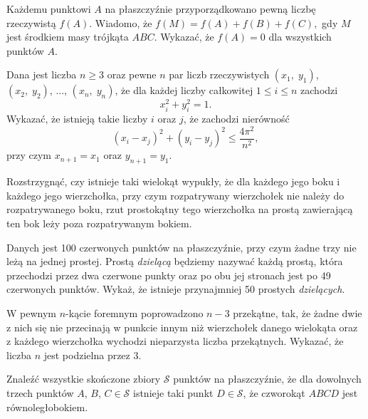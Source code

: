 \begin{problem}{1}
	Każdemu punktowi $A$ na płaszczyźnie przyporządkowano pewną liczbę rzeczywistą $f(A).$ Wiadomo, że $f(M)=f(A)+f(B)+f(C),$ gdy $M$ jest środkiem masy trójkąta $ABC.$ Wykazać, że $f(A)=0$ dla wszystkich punktów $A.$
\end{problem}

\begin{problem}{2}
	Dana jest liczba $n \geqslant 3$ oraz pewne $n$ par liczb rzeczywistych  $(x_1,\; y_1)$, $(x_2,\; y_2)$, ..., $(x_n, \; y_n)$, że dla każdej liczby całkowitej $1 \leqslant i \leqslant n$ zachodzi
	\[
		x_i^2 + y_i^2 = 1.
	\]
	Wykazać, że istnieją takie liczby $i$ oraz $j$, że zachodzi nierówność
	\[
		(x_i - x_{j})^2 + (y_i - y_{j})^2 \leqslant \frac{4\pi^2}{n^2},
	\]
	przy czym $x_{n + 1} = x_1$ oraz $y_{n + 1} = y_1$.
\end{problem}


\begin{problem}{3}
	Rozstrzygnąć, czy istnieje taki wielokąt wypukły, że dla każdego jego boku i każdego jego wierzchołka, przy czym rozpatrywany wierzchołek nie należy do rozpatrywanego boku, rzut prostokątny tego wierzchołka na prostą zawierającą ten bok leży poza rozpatrywanym bokiem.
\end{problem}

\begin{problem}{4}
	Danych jest 100 czerwonych punktów na płaszczyźnie, przy czym żadne trzy nie leżą na jednej prostej. Prostą \textit{dzielącą} będziemy nazywać każdą prostą, która przechodzi przez dwa czerwone punkty oraz po obu jej stronach jest po 49 czerwonych punktów. Wykaż, że istnieje przynajmniej 50 prostych \textit{dzielących}.
\end{problem}
 
\begin{problem}{5}
	W pewnym $n$-kącie foremnym poprowadzono $n - 3$ przekątne, tak, że żadne dwie z nich się nie przecinają w punkcie innym niż wierzchołek danego wielokąta oraz z każdego wierzchołka wychodzi nieparzysta liczba przekątnych. Wykazać, że liczba $n$ jest podzielna przez $3$.
\end{problem}

\begin{problem}{6}
	Znaleźć wszystkie skończone zbiory $\mathcal{S}$ punktów na płaszczyźnie, że dla dowolnych trzech punktów $A$, $B$, $C \in \mathcal{S}$ istnieje taki punkt $D \in \mathcal{S}$, że czworokąt $ABCD$ jest równoległobokiem.
\end{problem}